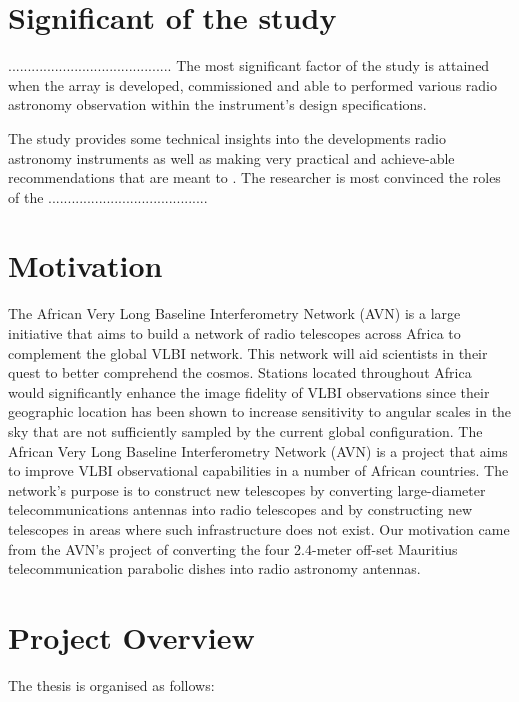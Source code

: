 {\section{Significant of the study}

..........................................
The most significant factor of the study is attained when the array is developed, commissioned and able to performed various radio astronomy observation within the instrument's design specifications.

The study provides some technical insights into the developments radio astronomy instruments as well as making very practical and achieve-able recommendations that are meant to .  The researcher is most convinced the roles of the 
.........................................

\section{Motivation}

The African Very Long Baseline Interferometry Network (AVN) is a large initiative that aims to build a network of radio telescopes across Africa to complement the global VLBI network. This network will aid scientists in their quest to better comprehend the cosmos.
Stations located throughout Africa would significantly enhance the image fidelity of VLBI observations since their geographic location has been shown to increase sensitivity to angular scales in the sky that are not sufficiently sampled by the current global configuration. The African Very Long Baseline Interferometry Network (AVN) is a project that aims to improve VLBI observational capabilities in a number of African countries.
The network's purpose is to construct new telescopes by converting large-diameter telecommunications antennas into radio telescopes and by constructing new telescopes in areas where such infrastructure does not exist.
Our motivation came from the AVN's project of converting the four 2.4-meter off-set Mauritius telecommunication parabolic dishes into radio astronomy antennas.

\section{ Project Overview}
The thesis is organised as follows:

}
